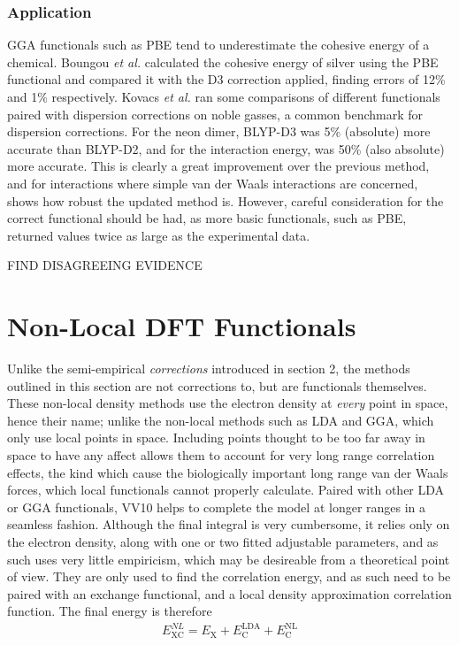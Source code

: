\documentclass[10pt,a4paper,twocolumn,twoside]{extarticle}
\newcommand{\al}{\emph{et al. }}
\begin{document}
	\subsubsection{Application}
	 GGA functionals such as PBE tend to underestimate the cohesive energy of a chemical. Boungou \al calculated the cohesive energy of silver using the PBE functional and compared it with the D3 correction applied, finding errors of 12\% and 1\% respectively.\cite{Boungou2021} 
	 Kovacs \al ran some comparisons of different functionals paired with dispersion corrections on noble gasses, a common benchmark for dispersion corrections. For the neon dimer, BLYP-D3 was 5\% (absolute) more accurate than BLYP-D2, and for the interaction energy, was 50\% (also absolute) more accurate.\cite{Kovacs2017} 
	 This is clearly a great improvement over the previous method, and for interactions where simple van der Waals interactions are concerned, shows how robust the updated method is. However, careful consideration for the correct functional should be had, as more basic functionals, such as PBE, returned values twice as large as the experimental data.\cite{Kovacs2017}

	 FIND DISAGREEING EVIDENCE 



	\section{Non-Local DFT Functionals}

	Unlike the semi-empirical \emph{corrections} introduced in section 2, the methods outlined in this section are not corrections to, but are functionals themselves. These non-local density methods use the electron density at \emph{every} point in space, hence their name; unlike the non-local methods such as LDA and GGA, which only use local points in space. Including points thought to be too far away in space to have any affect allows them to account for very long range correlation effects, the kind which cause the biologically important long range van der Waals forces, which local functionals cannot properly calculate. Paired with other LDA or GGA functionals, VV10 helps to complete the model at longer ranges in a seamless fashion. Although the final integral is very cumbersome, it relies only on the electron density, along with one or two fitted adjustable parameters, and as such uses very little empiricism, which may be desireable from a theoretical point of view. They are only used to find the correlation energy, and as such need to be paired with an exchange functional, and a local density approximation correlation function. The final energy is therefore
	\begin{align}
		E_\text{XC}^{NL} = E_\text{X} + E_\text{C}^\text{LDA} + E_\text{C}^\text{NL}
	\end{align} 
\end{document}
